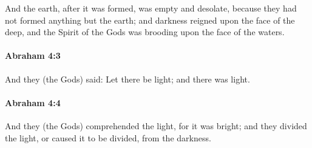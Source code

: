 			And the earth, after it was formed, was empty and desolate, because they had not formed anything but the earth; and darkness reigned upon the face of the deep, and the Spirit of the Gods was brooding upon the face of the waters.


		\paragraph{Abraham 4:3} %
			\label{ABRAHAM-4-3}

			And they (the Gods) said: Let there be light; and there was light.


		\paragraph{Abraham 4:4} %
			\label{ABRAHAM-4-4}

			And they (the Gods) comprehended the light, for it was bright; and they divided the light, or caused it to be divided, from the darkness.

